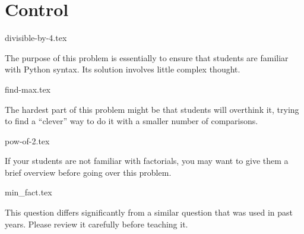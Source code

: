 \documentclass{exam}
\begin{document}
\section{Control}
\begin{questions}
{divisible-by-4.tex}
\begin{questionmeta}
  The purpose of this problem is essentially to ensure that students are familiar with Python syntax. Its solution involves little complex thought. 
\end{questionmeta}
{find-max.tex} 
\begin{questionmeta}
  The hardest part of this problem might be that students will overthink it, trying to find a ``clever'' way to do it with a smaller number of comparisons. 
\end{questionmeta}
{pow-of-2.tex}
\begin{questionmeta}
  If your students are not familiar with factorials, you may want to give them a brief overview before going over this problem. 
\end{questionmeta}
{min_fact.tex}
\begin{questionmeta}
  This question differs significantly from a similar question that was used in past years. Please review it carefully before teaching it. 
\end{questionmeta}
\end{questions}
\end{document}
